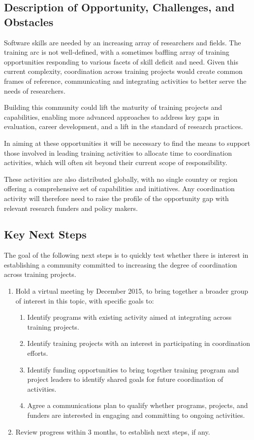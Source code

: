 \subsection{Description of Opportunity, Challenges, and Obstacles}

Software skills are needed by an increasing array of researchers and fields. The training arc is not well-defined, with a sometimes baffling array of training opportunities responding to various facets of skill deficit and need. Given this current complexity, coordination across training projects would create common frames of reference, communicating and integrating activities to better serve the needs of researchers. 

Building this community could lift the maturity of training projects and capabilities, enabling more advanced approaches to address key gaps in evaluation, career development, and a lift in the standard of research practices. 

In aiming at these opportunities it will be necessary to find the means to support those involved in leading training activities to allocate time to coordination activities, which will often sit beyond their current scope of responsibility. 

These activities are also distributed globally, with no single country or region offering a comprehensive set of capabilities and initiatives. Any coordination activity will therefore need to raise the profile of the opportunity gap with relevant research funders and policy makers.

\subsection{Key Next Steps}

The goal of the following next steps is to quickly test whether there is interest in establishing a community committed to increasing the degree of coordination across training projects.

\begin{enumerate}
    \item Hold a virtual meeting by December 2015, to bring together a broader group of interest in this topic, with specific goals to:
    \begin{enumerate}
        \item Identify programs with existing activity aimed at integrating across training projects.
        \item Identify training projects with an interest in participating in coordination efforts.
        \item Identify funding opportunities to bring together training program and project leaders to identify shared goals for future coordination of activities.
        \item Agree a communications plan to qualify whether programs, projects, and funders are interested in engaging and committing to ongoing activities.
    \end{enumerate}
    \item Review progress within 3 months, to establish next steps, if any.
\end{enumerate}


